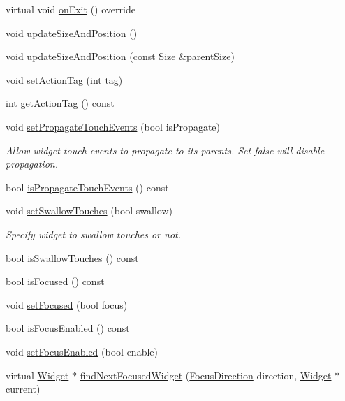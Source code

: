 \begin{DoxyCompactItemize}
\item 
virtual void \hyperlink{classui_1_1Widget_a541dd9c8492eeb30a2e50b97cc94bd6e}{on\+Exit} () override
\item 
void \hyperlink{classui_1_1Widget_a5c67abbcfeb1323fb80319f6db9d8e14}{update\+Size\+And\+Position} ()
\item 
void \hyperlink{classui_1_1Widget_a77fcdcda9d9affafe2a16e369ae8fb05}{update\+Size\+And\+Position} (const \hyperlink{classSize}{Size} \&parent\+Size)
\item 
void \hyperlink{classui_1_1Widget_a49aa79c6bdbcbb4d41d02e8d424826cb}{set\+Action\+Tag} (int tag)
\item 
int \hyperlink{classui_1_1Widget_abced1bc5fc63741d0625f37bf4f234c2}{get\+Action\+Tag} () const
\item 
void \hyperlink{classui_1_1Widget_a3f6b52776496c03a508df35b5cfd28f3}{set\+Propagate\+Touch\+Events} (bool is\+Propagate)
\begin{DoxyCompactList}\small\item\em Allow widget touch events to propagate to its parents. Set false will disable propagation. \end{DoxyCompactList}\item 
bool \hyperlink{classui_1_1Widget_ad4aaaf33aa2d6d06df5a50c4c50971e0}{is\+Propagate\+Touch\+Events} () const
\item 
void \hyperlink{classui_1_1Widget_a6c032c79a09975f53518172606f07c14}{set\+Swallow\+Touches} (bool swallow)
\begin{DoxyCompactList}\small\item\em Specify widget to swallow touches or not. \end{DoxyCompactList}\item 
bool \hyperlink{classui_1_1Widget_aa2dab2eca5024f96792a40f5de49f415}{is\+Swallow\+Touches} () const
\item 
bool \hyperlink{classui_1_1Widget_a92a51af74b3c009cf231185554044f50}{is\+Focused} () const
\item 
void \hyperlink{classui_1_1Widget_a8f201a8a4676a135d4e77d2be62cac2b}{set\+Focused} (bool focus)
\item 
bool \hyperlink{classui_1_1Widget_ad8fd665970343c600150eef5a0646126}{is\+Focus\+Enabled} () const
\item 
void \hyperlink{classui_1_1Widget_a017596c74cbd8b7304b27cf2b0eb4756}{set\+Focus\+Enabled} (bool enable)
\item 
virtual \hyperlink{classui_1_1Widget}{Widget} $\ast$ \hyperlink{classui_1_1Widget_aa50c26d9c13f00bada9f14f01a0bfbe4}{find\+Next\+Focused\+Widget} (\hyperlink{classui_1_1Widget_a8ae8e8fc793a04a87584205cd1e8a8a5}{Focus\+Direction} direction, \hyperlink{classui_1_1Widget}{Widget} $\ast$current)

\end{DoxyCompactItemize}
